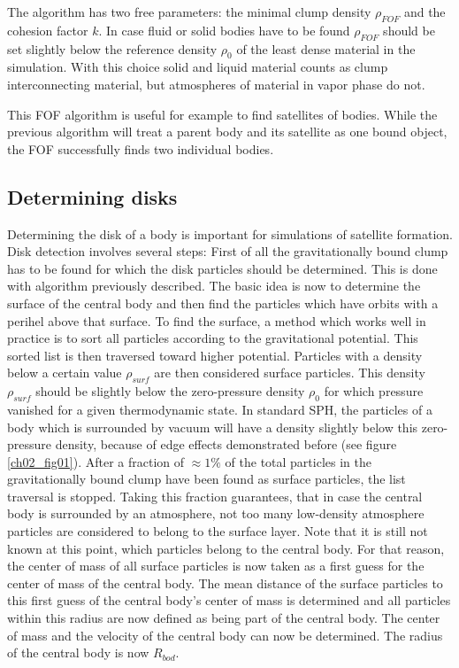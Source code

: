 The algorithm has two free parameters: the minimal clump density $\rho_{FOF}$ and the cohesion factor $k$. In case fluid or solid bodies have to be found $\rho_{FOF}$ should be set slightly below the reference density $\rho_0$ of the least dense material in the simulation. With this choice solid and liquid material counts as clump interconnecting material, but atmospheres of material in vapor phase do not.

This FOF algorithm is useful for example to find satellites of bodies. While the previous algorithm will treat a parent body and its satellite as one bound object, the FOF successfully finds two individual bodies.

\subsection{Determining disks}
\label{ch02_sec04_ss07}
Determining the disk of a body is important for simulations of satellite formation. Disk detection involves several steps:  First of all the gravitationally bound clump has to be found for which the disk particles should be determined. This is done with algorithm previously described.
The basic idea is now to determine the surface of the central body and then find the particles which have orbits with a perihel above that surface. To find the surface, a method which works well in practice is to sort all particles according to the gravitational potential. This sorted list is then traversed toward higher potential. Particles with a density below a certain value $\rho_{surf}$ are then considered surface particles. This density $\rho_{surf}$ should be slightly below the zero-pressure density $\rho_0$ for which pressure vanished for a given thermodynamic state. In standard SPH, the particles of a body which is surrounded by vacuum will have a density slightly below this zero-pressure density, because of edge effects demonstrated before  (see figure \ref{ch02_fig01}). After a fraction of $\approx 1\%$ of the total particles in the gravitationally bound clump have been found as surface particles, the list traversal is stopped. Taking this fraction guarantees, that in case the central body is surrounded by an atmosphere, not too many low-density atmosphere particles are considered to belong to the surface layer. Note that it is still not known at this point, which particles belong to the central body. For that reason, the center of mass of all surface particles is now taken as a first guess for the center of mass of the central body. The mean distance of the surface particles to this first guess of the central body's center of mass is determined and all particles within this radius are now defined as being part of the central body. The center of mass and the velocity of the central body can now be determined. The radius of the central body is now $R_{bod}$.
